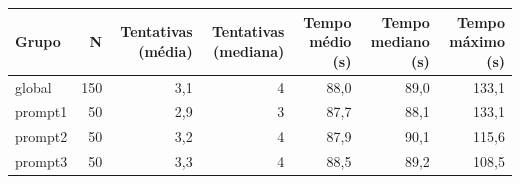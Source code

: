 \begin{tabular}{lrrrrrr}
\toprule
Grupo & N & Tentativas (média) & Tentativas (mediana) & Tempo médio (s) & Tempo mediano (s) & Tempo máximo (s) \\
\midrule
global & 150 & 3,1 & 4 & 88,0 & 89,0 & 133,1 \\
prompt1 & 50 & 2,9 & 3 & 87,7 & 88,1 & 133,1 \\
prompt2 & 50 & 3,2 & 4 & 87,9 & 90,1 & 115,6 \\
prompt3 & 50 & 3,3 & 4 & 88,5 & 89,2 & 108,5 \\
\bottomrule
\end{tabular}
